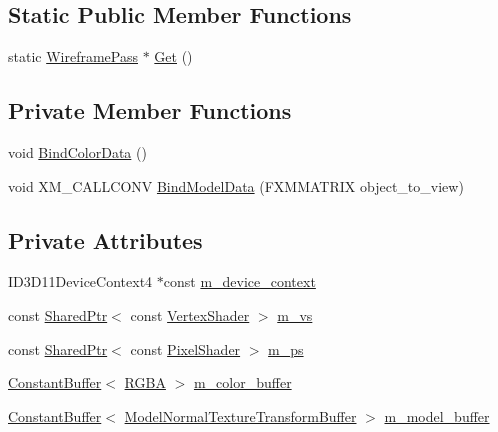 \subsection*{Static Public Member Functions}
\begin{DoxyCompactItemize}
\item 
static \hyperlink{classmage_1_1_wireframe_pass}{Wireframe\+Pass} $\ast$ \hyperlink{classmage_1_1_wireframe_pass_ace5168eac9d32c1bfa71df3411960f48}{Get} ()
\end{DoxyCompactItemize}
\subsection*{Private Member Functions}
\begin{DoxyCompactItemize}
\item 
void \hyperlink{classmage_1_1_wireframe_pass_a574897c1274585057e8d44070409b7e3}{Bind\+Color\+Data} ()
\item 
void X\+M\+\_\+\+C\+A\+L\+L\+C\+O\+NV \hyperlink{classmage_1_1_wireframe_pass_a6e316eaabf3afb71162490c1f3c244f3}{Bind\+Model\+Data} (F\+X\+M\+M\+A\+T\+R\+IX object\+\_\+to\+\_\+view)
\end{DoxyCompactItemize}
\subsection*{Private Attributes}
\begin{DoxyCompactItemize}
\item 
I\+D3\+D11\+Device\+Context4 $\ast$const \hyperlink{classmage_1_1_wireframe_pass_ac0f6bc1488ab515fe00d6e7abf230636}{m\+\_\+device\+\_\+context}
\item 
const \hyperlink{namespacemage_a1e01ae66713838a7a67d30e44c67703e}{Shared\+Ptr}$<$ const \hyperlink{classmage_1_1_vertex_shader}{Vertex\+Shader} $>$ \hyperlink{classmage_1_1_wireframe_pass_aa55de3b804055362812bcf775e0dffb4}{m\+\_\+vs}
\item 
const \hyperlink{namespacemage_a1e01ae66713838a7a67d30e44c67703e}{Shared\+Ptr}$<$ const \hyperlink{namespacemage_a27ecaf266420ee7a494d64edc0757129}{Pixel\+Shader} $>$ \hyperlink{classmage_1_1_wireframe_pass_a39577f12ad9b3f72e703c290cbf46002}{m\+\_\+ps}
\item 
\hyperlink{classmage_1_1_constant_buffer}{Constant\+Buffer}$<$ \hyperlink{structmage_1_1_r_g_b_a}{R\+G\+BA} $>$ \hyperlink{classmage_1_1_wireframe_pass_acb2aaf33841a4f08edb50f9b72637d93}{m\+\_\+color\+\_\+buffer}
\item 
\hyperlink{classmage_1_1_constant_buffer}{Constant\+Buffer}$<$ \hyperlink{structmage_1_1_model_normal_texture_transform_buffer}{Model\+Normal\+Texture\+Transform\+Buffer} $>$ \hyperlink{classmage_1_1_wireframe_pass_aa7fb7cbba08fe8b4d7defab36d2e82a7}{m\+\_\+model\+\_\+buffer}
\end{DoxyCompactItemize}


